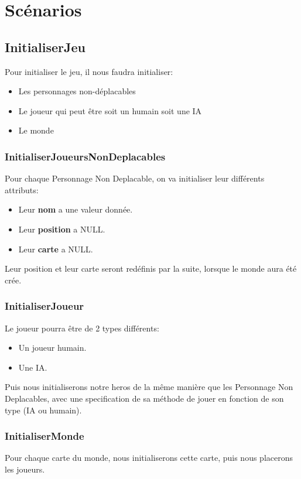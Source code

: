 \chapter{Scénarios}
    \section{InitialiserJeu}
        Pour initialiser le jeu, il nous faudra initialiser:
        \begin{itemize}
            \item Les personnages non-déplacables
            \item Le joueur qui peut être soit un humain soit une IA
            \item Le monde
        \end{itemize}
        \subsection{InitialiserJoueursNonDeplacables}
            Pour chaque Personnage Non Deplacable, on va initialiser leur différents attributs:
            \begin{itemize}
                \item Leur \textbf{nom} a une valeur donnée.
                \item Leur \textbf{position} a NULL.
                \item Leur \textbf{carte} a NULL.
            \end{itemize}
            Leur position et leur carte seront redéfinis par la suite, lorsque le monde aura été crée.\\
        \subsection{InitialiserJoueur}
            Le joueur pourra être de 2 types diff\'erents:
            \begin{itemize}
                \item Un joueur humain.
                \item Une IA.
            \end{itemize}
            Puis nous initialiserons notre heros de la même manière que les Personnage Non Deplacables, avec une specification de sa m\'ethode de jouer en fonction de son type (IA ou humain).
        \subsection{InitialiserMonde}
            Pour chaque carte du monde, nous initialiserons cette carte, puis nous placerons les joueurs.
